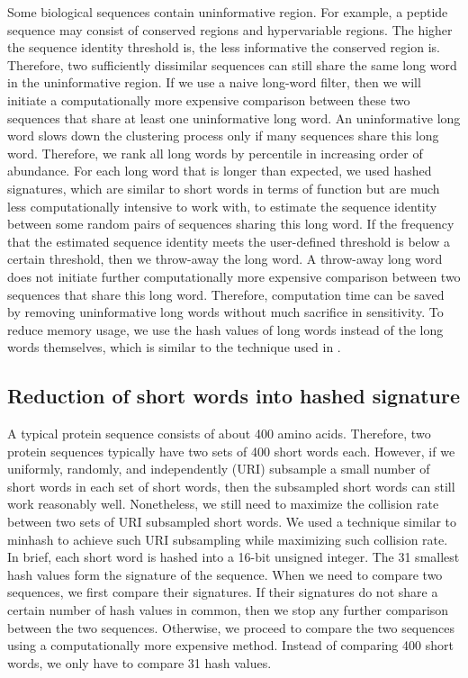 \documentclass[11pt,letterpaper]{article}
\begin{document}
Some biological sequences contain uninformative region.
For example, a peptide sequence may consist of conserved regions and hypervariable regions.
The higher the sequence identity threshold is, the less informative the conserved region is.
Therefore, two sufficiently dissimilar sequences can still share the same long word in the uninformative region.
If we use a naive long-word filter, then we will initiate a computationally more expensive comparison between these two sequences that share at least one uninformative long word.
An uninformative long word slows down the clustering process only if many sequences share this long word.
Therefore, we rank all long words by percentile in increasing order of abundance.
For each long word that is longer than expected, we used hashed signatures, which are similar to short words in terms of function but are much less computationally intensive to work with, to estimate the sequence identity between some random pairs of sequences sharing this long word.
If the frequency that the estimated sequence identity meets the user-defined threshold is below a certain threshold,
then we throw-away the long word.
A throw-away long word does not initiate further computationally more expensive comparison between two sequences that share this long word.
Therefore, computation time can be saved by removing uninformative long words without much sacrifice in sensitivity.
To reduce memory usage, we use the hash values of long words instead of the long words themselves, which is similar to the technique used in \citet{steinegger2017Linclust}.

\subsection{Reduction of short words into hashed signature}

A typical protein sequence consists of about 400 amino acids.
Therefore, two protein sequences typically have two sets of 400 short words each.
However, if we uniformly, randomly, and independently (URI) subsample a small number of short words in each set of short words, then the subsampled short words can still work reasonably well. 
Nonetheless, we still need to maximize the collision rate between two sets of URI subsampled short words.
We used a technique similar to minhash to achieve such URI subsampling while maximizing such collision rate.
In brief, each short word is hashed into a 16-bit unsigned integer.
The 31 smallest hash values form the signature of the sequence.
When we need to compare two sequences, we first compare their signatures.
If their signatures do not share a certain number of hash values in common, then we stop any further comparison between the two sequences. 
Otherwise, we proceed to compare the two sequences using a computationally more expensive method.
Instead of comparing 400 short words, we only have to compare 31 hash values.
\end{document}
